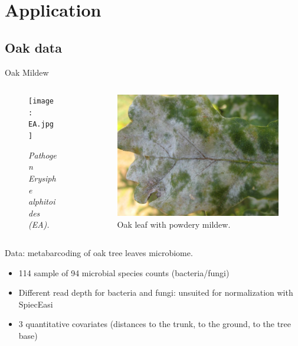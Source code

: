 \documentclass{beamer}
\begin{document}
\section{Application}
\subsection{Oak data}


\begin{frame}{Oak Mildew}
\begin{columns}
\begin{column}{5cm}
\begin{figure}[htp]
\centering
\texttt{[image: EA.jpg]}
\caption{\textit{Pathogen Erysiphe alphitoides (EA).}}
\end{figure}
\end{column}
\begin{column}{6cm}
\begin{figure}[htp]
\centering
\includegraphics[scale=0.1]{mildew.jpg}
\caption{Oak leaf with powdery mildew.}
\end{figure}
\end{column}
\end{columns}
\vspace{0.5cm}
Data: metabarcoding of oak tree leaves microbiome.\\

\begin{itemize}
	\item 114 sample of 94 microbial species counts (bacteria/fungi)
	\item Different read depth for bacteria and fungi: unsuited for normalization with SpiecEasi
	\item 3 quantitative covariates (distances to the trunk, to the ground, to the tree base)
\end{itemize}
\end{frame}
\end{document}
